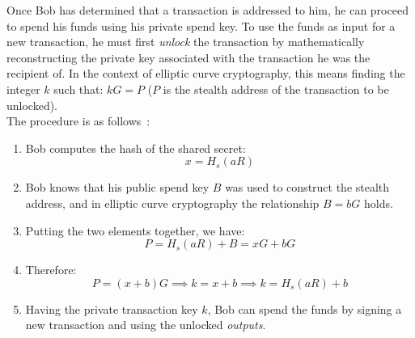 \documentclass[conference]{IEEEtran}
\begin{document}
Once Bob has determined that a transaction is addressed to him, he can proceed to spend his funds using his private spend key. To use the funds as input for a new transaction, he must first \textit{unlock} the transaction by mathematically reconstructing the private key associated with the transaction he was the recipient of. In the context of elliptic curve cryptography, this means finding the integer $k$ such that: $kG = P$ ($P$ is the stealth address of the transaction to be unlocked).\\
The procedure is as follows~\cite{zero_to_monero_2}:
\begin{enumerate}
\item Bob computes the hash of the shared secret:
\[
x = H_s(aR)
\]
\item Bob knows that his public spend key $B$ was used to construct the stealth address, and in elliptic curve cryptography the relationship $B = bG$ holds.
\item Putting the two elements together, we have:
\[
P = H_s(aR) + B = xG + bG
\]
\item Therefore:
\[
P = (x + b)G \implies k = x + b \implies k = H_s(aR) + b
\]
\item Having the private transaction key $k$, Bob can spend the funds by signing a new transaction and using the unlocked \textit{outputs}.
\end{enumerate}

\end{document}
